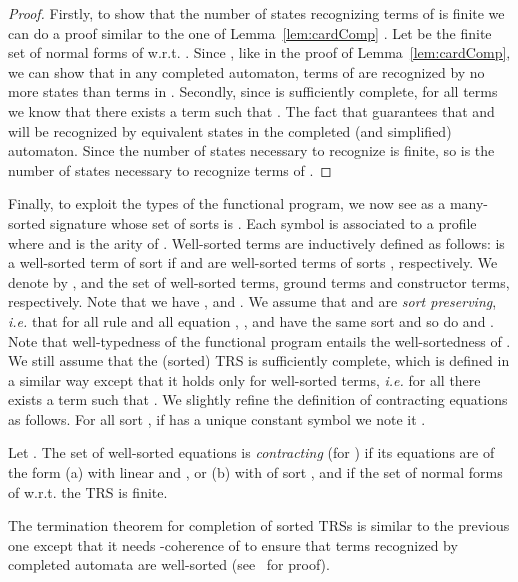 \documentclass[a4paper,11pt]{llncs}
\theoremstyle{plain}
\begin{document}
\begin{proof}
  Firstly, to show that the number of states recognizing terms
  of  is finite we can do a proof similar to the one of
  Lemma~\ref{lem:cardComp} . Let  be the finite set of normal forms
  of  w.r.t. . Since , like in the proof
  of Lemma~\ref{lem:cardComp}, we can show that in any completed automaton,
  terms of  are recognized by no more states than terms in . Secondly,
  since  is sufficiently complete, for all terms  we
  know that there exists a term  such that . The
  fact that  guarantees that  and  will be recognized by
  equivalent states in the completed (and simplified) automaton. Since the
  number of states necessary to recognize  is finite, so is the number of
  states necessary to recognize terms of . 
\end{proof}


\noindent
Finally, to exploit the types of the functional program, we now see  as a
many-sorted signature whose set of sorts is . Each symbol  is associated to a profile  where  and  is the arity of . 
Well-sorted terms are inductively defined as follows:  is a
well-sorted term of sort  if  and
 are well-sorted terms of sorts ,
respectively. We denote by ,  and  the set of well-sorted
terms, ground terms and constructor terms, respectively. Note that we have
,  and .  
We assume that  and  are {\em sort preserving}, {\em
  i.e.} that for all rule  and all equation , ,  and  have the same sort and so do  and . 
Note that well-typedness of the functional program entails the well-sortedness
of . We
still assume that the (sorted) TRS is sufficiently 
complete, which is defined in a similar way except that it holds only for
well-sorted terms, {\em i.e.}  for all  there exists a term
 such that .
We slightly refine the definition of contracting equations as follows. For all
sort , if  has a unique constant symbol we note it .

\begin{definition}
Let . The set of well-sorted equations  is {\em
  contracting} (for ) if its equations are of the form (a)  with  linear and , or
(b)  with  of sort , and if the set of normal forms of 
w.r.t. the TRS   is
finite.
\end{definition}

\noindent
The termination theorem for completion of sorted TRSs is similar to the
previous one except that
it needs -coherence of  to ensure that terms
recognized by completed automata are well-sorted (see~\cite{Genet-rep13} for proof).
\end{document}
